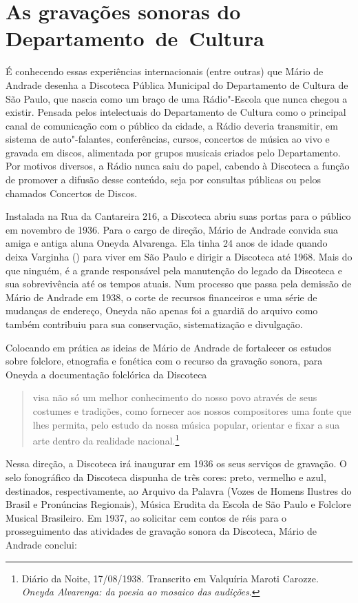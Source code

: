\section{As gravações sonoras do Departamento~de~Cultura}

É conhecendo essas experiências internacionais (entre outras) que Mário
de Andrade desenha a Discoteca Pública Municipal do Departamento de
Cultura de São Paulo, que nascia como um braço de uma Rádio"-Escola que
nunca chegou a existir. Pensada pelos intelectuais do Departamento de
Cultura como o principal canal de comunicação com o público da cidade, a
Rádio deveria transmitir, em sistema de auto"-falantes, conferências,
cursos, concertos de música ao vivo e gravada em discos, alimentada por
grupos musicais criados pelo Departamento. Por motivos diversos, a Rádio
nunca saiu do papel, cabendo à Discoteca a função de promover a difusão
desse conteúdo, seja por consultas públicas ou pelos chamados Concertos
de Discos.

Instalada na Rua da Cantareira 216, a Discoteca abriu suas portas para o
público em novembro de 1936. Para o cargo de direção, Mário de Andrade
convida sua amiga e antiga aluna Oneyda Alvarenga. Ela tinha 24 anos de
idade quando deixa Varginha () para viver em São Paulo e dirigir a
Discoteca até 1968. Mais do que ninguém, é a grande responsável pela
manutenção do legado da Discoteca e sua sobrevivência até os tempos
atuais. Num processo que passa pela demissão de Mário de Andrade em
1938, o corte de recursos financeiros e uma série de mudanças de
endereço, Oneyda não apenas foi a guardiã do arquivo como também
contribuiu para sua conservação, sistematização e divulgação.

Colocando em prática as ideias de Mário de Andrade de fortalecer os
estudos sobre folclore, etnografia e fonética com o recurso da gravação
sonora, para Oneyda a documentação folclórica da Discoteca

\begin{quote}
visa não só um melhor conhecimento do nosso povo através de seus
costumes e tradições, como fornecer aos nossos compositores uma fonte
que lhes permita, pelo estudo da nossa música popular, orientar e fixar
a sua arte dentro da realidade nacional.\footnote{Diário da Noite,
  17/08/1938. Transcrito em Valquíria Maroti Carozze. \emph{Oneyda
  Alvarenga: da poesia ao mosaico das audições}.}
\end{quote}

Nessa direção, a Discoteca irá inaugurar em 1936 os seus serviços de
gravação. O selo fonográfico da Discoteca dispunha de três cores: preto,
vermelho e azul, destinados, respectivamente, ao Arquivo da Palavra
(Vozes de Homens Ilustres do Brasil e Pronúncias Regionais), Música
Erudita da Escola de São Paulo e Folclore Musical Brasileiro. Em 1937,
ao solicitar cem contos de réis para o prosseguimento das atividades de
gravação sonora da Discoteca, Mário de Andrade conclui:

